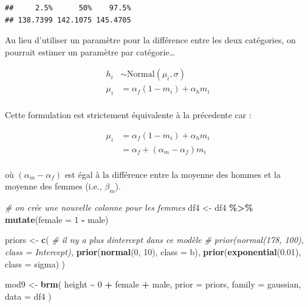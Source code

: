 \documentclass[
  a4paper,11pt,twoside,onecolumn,openright,final,oldfontcommands]{memoir}
\newenvironment{Shaded}{\begin{snugshade}}{\end{snugshade}}
\newcommand{\CommentTok}[1]{\textcolor[rgb]{0.56,0.35,0.01}{\textit{#1}}}
\newcommand{\DataTypeTok}[1]{\textcolor[rgb]{0.13,0.29,0.53}{#1}}
\newcommand{\DecValTok}[1]{\textcolor[rgb]{0.00,0.00,0.81}{#1}}
\newcommand{\FloatTok}[1]{\textcolor[rgb]{0.00,0.00,0.81}{#1}}
\newcommand{\KeywordTok}[1]{\textcolor[rgb]{0.13,0.29,0.53}{\textbf{#1}}}
\newcommand{\NormalTok}[1]{#1}
\newcommand{\OperatorTok}[1]{\textcolor[rgb]{0.81,0.36,0.00}{\textbf{#1}}}
\newcommand{\StringTok}[1]{\textcolor[rgb]{0.31,0.60,0.02}{#1}}
\theoremstyle{definition}
\theoremstyle{definition}
\theoremstyle{definition}
\theoremstyle{remark}
\begin{document}
\begin{verbatim}
##     2.5%      50%    97.5% 
## 138.7399 142.1075 145.4705
\end{verbatim}

Au lieu d'utiliser un paramètre pour la différence entre les deux catégories, on pourrait estimer un paramètre par catégorie\ldots{}

\[
\begin{aligned}
h_{i} &\sim \mathrm{Normal}(\mu_{i}, \sigma) \\
\mu_{i} &= \alpha_{f}(1 - m_{i}) + \alpha_{h} m_{i} \\
\end{aligned}
\]

Cette formulation est strictement équivalente à la précedente car :

\[
\begin{aligned}
\mu_{i} &= \alpha_{f}(1 - m_{i}) + \alpha_{h} m_{i} \\
&= \alpha_{f} + (\alpha_{m} - \alpha_{f}) m_{i} \\
\end{aligned}
\]

où \((\alpha_{m} - \alpha_{f})\) est égal à la différence entre la moyenne des hommes et la moyenne des femmes (i.e., \(\beta_{m}\)).

\begin{Shaded}
\begin{Highlighting}[]
\CommentTok{\# on crée une nouvelle colonne pour les femmes}
\NormalTok{df4 \textless{}{-}}\StringTok{ }\NormalTok{df4 }\OperatorTok{\%\textgreater{}\%}\StringTok{ }\KeywordTok{mutate}\NormalTok{(}\DataTypeTok{female =} \DecValTok{1} \OperatorTok{{-}}\StringTok{ }\NormalTok{male)}

\NormalTok{priors \textless{}{-}}\StringTok{ }\KeywordTok{c}\NormalTok{(}
  \CommentTok{\# il n\textquotesingle{}y a plus d\textquotesingle{}intercept dans ce modèle}
  \CommentTok{\# prior(normal(178, 100), class = Intercept),}
  \KeywordTok{prior}\NormalTok{(}\KeywordTok{normal}\NormalTok{(}\DecValTok{0}\NormalTok{, }\DecValTok{10}\NormalTok{), }\DataTypeTok{class =}\NormalTok{ b),}
  \KeywordTok{prior}\NormalTok{(}\KeywordTok{exponential}\NormalTok{(}\FloatTok{0.01}\NormalTok{), }\DataTypeTok{class =}\NormalTok{ sigma)}
\NormalTok{  )}

\NormalTok{mod9 \textless{}{-}}\StringTok{ }\KeywordTok{brm}\NormalTok{(}
\NormalTok{  height }\OperatorTok{\textasciitilde{}}\StringTok{ }\DecValTok{0} \OperatorTok{+}\StringTok{ }\NormalTok{female }\OperatorTok{+}\StringTok{ }\NormalTok{male,}
  \DataTypeTok{prior =}\NormalTok{ priors,}
  \DataTypeTok{family =}\NormalTok{ gaussian,}
  \DataTypeTok{data =}\NormalTok{ df4}
\NormalTok{  )}
\end{Highlighting}
\end{Shaded}
\end{document}
